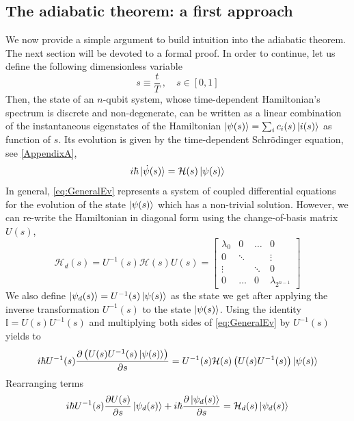 \subsection{The adiabatic theorem: a first approach}
We now provide a simple argument to build intuition into the adiabatic theorem. The next section will be devoted to a formal proof. In order to continue, let us define the following dimensionless variable
\begin{equation}
    s \equiv \frac{t}{T} \ , \quad s \in [0,1]
\end{equation}
Then, the state of an $n$-qubit system, whose time-dependent Hamiltonian's spectrum is discrete and non-degenerate, can be written as a linear combination of the instantaneous eigenstates of the Hamiltonian $\ket{\psi(s)} = \sum_{i}c_{i}(s)\ket{i(s)}$ as function of $s$. Its evolution is given by the time-dependent Schrödinger equation, see \ref{AppendixA},
\begin{equation}
\label{eq:GeneralEv}
    i\hbar \ket{\dot{\psi}(s)} = \mathcal{H}(s) \ket{\psi(s)}
\end{equation}
In general, \ref{eq:GeneralEv} represents a system of coupled differential equations for the evolution of the state $\ket{\psi(s)}$ which has a non-trivial solution. However, we can re-write the Hamiltonian in diagonal form using the change-of-basis matrix $U(s)$,
\begin{equation}
    \mathcal{H}_{d}(s) = U^{-1}(s)\mathcal{H}(s)U(s) = \begin{bmatrix}
           \lambda_{0} & 0 & \hdots & 0 \\
           0 &  \ddots & & \vdots \\
           \vdots &   & \ddots & 0 \\
           0 & \hdots & 0 & \lambda_{2^{n-1}}
         \end{bmatrix}
\end{equation}
We also define $\ket{\psi_{d}(s)} = U^{-1}(s)\ket{\psi(s)}$ as the state we get after applying the inverse transformation $U^{-1}(s)$ to the state $\ket{\psi(s)}$. Using the identity $\mathbb{I} = U(s)U^{-1}(s)$ and multiplying both sides of \ref{eq:GeneralEv} by $U^{-1}(s)$ yields to
\begin{equation}
     i\hbar U^{-1}(s) \frac{\partial \left(U(s)U^{-1}(s)\ket{\psi(s)}\right)}{\partial s} = U^{-1}(s)\mathcal{H}(s) \left(U(s)U^{-1}(s)\right)\ket{\psi(s)}
\end{equation}
Rearranging terms
\begin{equation}
     i\hbar U^{-1}(s) \frac{\partial U(s)}{\partial s}\ket{\psi_{d}(s)} + i\hbar  \frac{\partial \ket{\psi_{d}(s)}}{\partial s}= \mathcal{H}_{d}(s)\ket{\psi_{d}(s)}
\end{equation}
